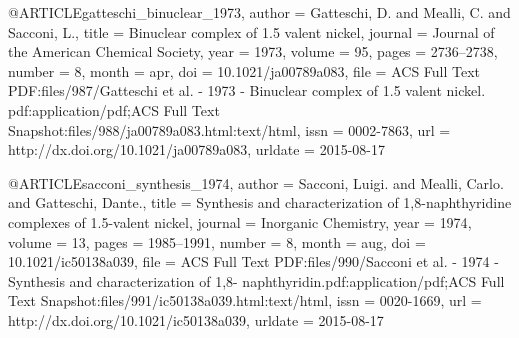 @ARTICLE{gatteschi_binuclear_1973,
  author = {Gatteschi, D. and Mealli, C. and Sacconi, L.},
  title = {Binuclear complex of 1.5 valent nickel},
  journal = {Journal of the American Chemical Society},
  year = {1973},
  volume = {95},
  pages = {2736--2738},
  number = {8},
  month = apr,
  doi = {10.1021/ja00789a083},
  file = {ACS Full Text PDF:files/987/Gatteschi et al. - 1973 - Binuclear complex of 1.5 valent nickel. pdf:application/pdf;ACS Full Text Snapshot:files/988/ja00789a083.html:text/html},
  issn = {0002-7863},
  url = {http://dx.doi.org/10.1021/ja00789a083},
  urldate = {2015-08-17}
}

@ARTICLE{sacconi_synthesis_1974,
  author = {Sacconi, Luigi. and Mealli, Carlo. and Gatteschi, Dante.},
  title = {Synthesis and characterization of 1,8-naphthyridine complexes of
	1.5-valent nickel},
  journal = {Inorganic Chemistry},
  year = {1974},
  volume = {13},
  pages = {1985--1991},
  number = {8},
  month = aug,
  doi = {10.1021/ic50138a039},
  file = {ACS Full Text PDF:files/990/Sacconi et al. - 1974 - Synthesis and characterization of 1,8-    naphthyridin.pdf:application/pdf;ACS Full Text Snapshot:files/991/ic50138a039.html:text/html},
  issn = {0020-1669},
  url = {http://dx.doi.org/10.1021/ic50138a039},
  urldate = {2015-08-17}
}

